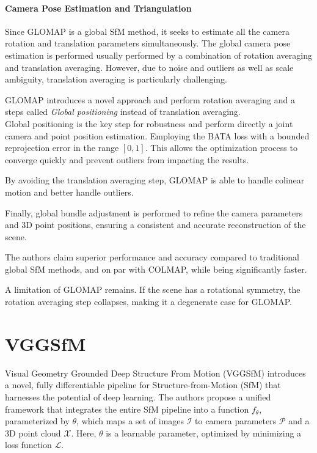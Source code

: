 \paragraph{Camera Pose Estimation and Triangulation}
Since GLOMAP is a global SfM method, it seeks to estimate all the camera rotation and translation parameters simultaneously.
The global camera pose estimation is performed usually performed by a combination of rotation averaging and translation averaging. 
However, due to noise and outliers as well as scale ambiguity, translation averaging is particularly challenging.

GLOMAP introduces a novel approach and perform rotation averaging and a steps called \emph{Global positioning} instead of translation averaging. \\
Global positioning is the key step for robustness and perform directly a joint camera and point position estimation. 
Employing the BATA loss \cite{zhuang2019baselinedesensitizingtranslationaveraging} with a bounded reprojection error in the range $[0, 1]$. 
This allows the optimization process to converge quickly and prevent outliers from impacting the results.

By avoiding the translation averaging step, GLOMAP is able to handle colinear motion and better handle outliers.

Finally, global bundle adjustment is performed to refine the camera parameters and 3D point positions, ensuring a consistent and accurate reconstruction of the scene.

The authors claim superior performance and accuracy compared to traditional global SfM methods, and on par with COLMAP, while being significantly faster.

A limitation of GLOMAP remains. If the scene has a rotational symmetry, the rotation averaging step collapses, making it a degenerate case for GLOMAP.

\section{VGGSfM}\label{sec:vggsfm}

Visual Geometry Grounded Deep Structure From Motion (VGGSfM) \cite{wang2023vggsfm} introduces a novel, fully differentiable pipeline for Structure-from-Motion (SfM) that harnesses the potential of deep learning. The authors propose a unified framework that integrates the entire SfM pipeline into a function $f_{\theta}$, parameterized by $\theta$, which maps a set of images $\mathcal{I}$ to camera parameters $\mathcal{P}$ and a 3D point cloud $\mathcal{X}$. Here, $\theta$ is a learnable parameter, optimized by minimizing a loss function $\mathcal{L}$.

